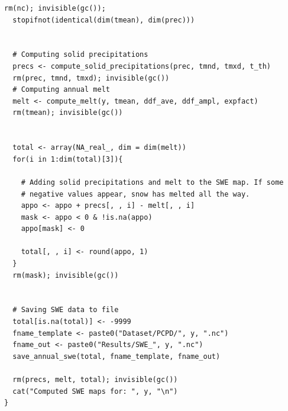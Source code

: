 \begin{lstlisting}[style=Rcode, caption={Model implementation. This code was used to generate the SWE maps.}, label={lst:swe}]
  rm(nc); invisible(gc());
  stopifnot(identical(dim(tmean), dim(prec)))


  # Computing solid precipitations
  precs <- compute_solid_precipitations(prec, tmnd, tmxd, t_th)
  rm(prec, tmnd, tmxd); invisible(gc())
  # Computing annual melt
  melt <- compute_melt(y, tmean, ddf_ave, ddf_ampl, expfact)
  rm(tmean); invisible(gc())
  
  
  total <- array(NA_real_, dim = dim(melt))
  for(i in 1:dim(total)[3]){
    
    # Adding solid precipitations and melt to the SWE map. If some 
    # negative values appear, snow has melted all the way.
    appo <- appo + precs[, , i] - melt[, , i]
    mask <- appo < 0 & !is.na(appo)
    appo[mask] <- 0
    
    total[, , i] <- round(appo, 1)
  }
  rm(mask); invisible(gc())
  

  # Saving SWE data to file
  total[is.na(total)] <- -9999
  fname_template <- paste0("Dataset/PCPD/", y, ".nc")
  fname_out <- paste0("Results/SWE_", y, ".nc")
  save_annual_swe(total, fname_template, fname_out)
  
  rm(precs, melt, total); invisible(gc())
  cat("Computed SWE maps for: ", y, "\n")
}
\end{lstlisting}